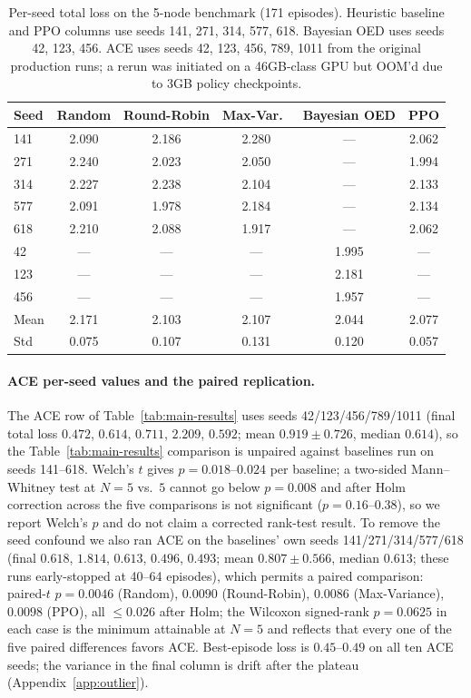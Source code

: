 \documentclass[twoside]{article}
\theoremstyle{plain}
\theoremstyle{definition}
\theoremstyle{remark}
\begin{document}
\begin{table}[h]
\centering
\caption{Per-seed total loss on the 5-node benchmark (171 episodes). Heuristic baseline and PPO columns use seeds 141, 271, 314, 577, 618. Bayesian OED uses seeds 42, 123, 456. ACE uses seeds 42, 123, 456, 789, 1011 from the original production runs; a rerun was initiated on a 46GB-class GPU but OOM'd due to 3GB policy checkpoints.}
\label{tab:5node-perseed}
\small
\begin{tabular}{@{}l ccc cc@{}}
\toprule
Seed & Random & Round-Robin & Max-Var.\ & Bayesian OED & PPO \\
\midrule
141 & 2.090 & 2.186 & 2.280 & ---   & 2.062 \\
271 & 2.240 & 2.023 & 2.050 & ---   & 1.994 \\
314 & 2.227 & 2.238 & 2.104 & ---   & 2.133 \\
577 & 2.091 & 1.978 & 2.184 & ---   & 2.134 \\
618 & 2.210 & 2.088 & 1.917 & ---   & 2.062 \\
42  & ---   & ---   & ---   & 1.995 & ---   \\
123 & ---   & ---   & ---   & 2.181 & ---   \\
456 & ---   & ---   & ---   & 1.957 & ---   \\
\midrule
Mean & 2.171 & 2.103 & 2.107 & 2.044 & 2.077 \\
Std  & 0.075 & 0.107 & 0.131 & 0.120 & 0.057 \\
\bottomrule
\end{tabular}
\end{table}

\paragraph{ACE per-seed values and the paired replication.} The ACE row of Table~\ref{tab:main-results} uses seeds 42/123/456/789/1011 (final total loss $0.472$, $0.614$, $0.711$, $2.209$, $0.592$; mean $0.919\pm0.726$, median $0.614$), so the Table~\ref{tab:main-results} comparison is unpaired against baselines run on seeds 141--618. Welch's $t$ gives $p=0.018$--$0.024$ per baseline; a two-sided Mann--Whitney test at $N{=}5$ vs.\ $5$ cannot go below $p=0.008$ and after Holm correction across the five comparisons is not significant ($p=0.16$--$0.38$), so we report Welch's $p$ and do not claim a corrected rank-test result. To remove the seed confound we also ran ACE on the baselines' own seeds 141/271/314/577/618 (final $0.618$, $1.814$, $0.613$, $0.496$, $0.493$; mean $0.807\pm0.566$, median $0.613$; these runs early-stopped at 40--64 episodes), which permits a paired comparison: paired-$t$ $p=0.0046$ (Random), $0.0090$ (Round-Robin), $0.0086$ (Max-Variance), $0.0098$ (PPO), all $\le0.026$ after Holm; the Wilcoxon signed-rank $p=0.0625$ in each case is the minimum attainable at $N{=}5$ and reflects that every one of the five paired differences favors ACE. Best-episode loss is $0.45$--$0.49$ on all ten ACE seeds; the variance in the final column is drift after the plateau (Appendix~\ref{app:outlier}).
\end{document}

